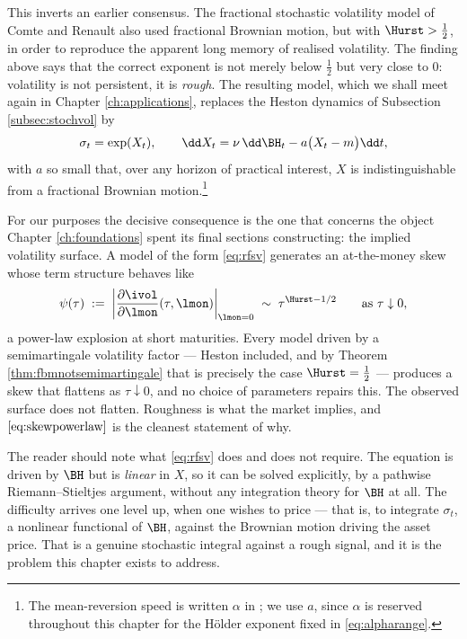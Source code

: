 This inverts an earlier consensus. The fractional stochastic volatility model of Comte and Renault
\cite{comterenault1998} also used fractional Brownian motion, but with $\Hurst > \tfrac12$, in order
to reproduce the apparent long memory of realised volatility. The finding above says that the
correct exponent is not merely below $\tfrac12$ but very close to $0$: volatility is not
persistent, it is \emph{rough}. The resulting model, which we shall meet again in Chapter
\ref{ch:applications}, replaces the Heston dynamics of Subsection \ref{subsec:stochvol} by
\begin{equation}\label{eq:rfsv}
\sigma_t = \exp(X_t), \qquad \dd X_t = \nu\,\dd \BH_t - a\bigl(X_t - m\bigr)\dd t,
\end{equation}
with $a$ so small that, over any horizon of practical interest, $X$ is indistinguishable from
a fractional Brownian motion.\footnote{The mean-reversion speed is written $\alpha$ in
\cite{gatheraljaissonrosenbaum2018}; we use $a$, since $\alpha$ is reserved throughout this chapter
for the H\"older exponent fixed in \eqref{eq:alpharange}.}

For our purposes the decisive consequence is the one that concerns the object Chapter \ref{ch:foundations}
spent its final sections constructing: the implied volatility surface. A model of the form
\eqref{eq:rfsv} generates an at-the-money skew whose term structure behaves like
\begin{equation}\label{eq:skewpowerlaw}
\psi(\tau) \;:=\; \biggl|\frac{\partial \ivol}{\partial \lmon}(\tau,\lmon)\biggr|_{\lmon=0} \;\sim\; \tau^{\Hurst - 1/2}
\qquad \text{as } \tau \downarrow 0 ,
\end{equation}
a power-law explosion at short maturities. Every model driven by a semimartingale volatility
factor --- Heston included, and by Theorem \ref{thm:fbmnotsemimartingale} that is precisely the
case $\Hurst = \tfrac12$ --- produces a skew that flattens as $\tau \downarrow 0$, and no choice of
parameters repairs this. The observed surface does not flatten. Roughness is what the market
implies, and $\eqref{eq:skewpowerlaw}$ is the cleanest statement of why.

\begin{remark}
The reader should note what \eqref{eq:rfsv} does and does not require. The equation is driven by
$\BH$ but is \emph{linear} in $X$, so it can be solved explicitly, by a pathwise
Riemann--Stieltjes argument, without any integration theory for $\BH$ at all. The difficulty
arrives one level up, when one wishes to price --- that is, to integrate $\sigma_t$, a nonlinear
functional of $\BH$, against the Brownian motion driving the asset price. That is a genuine
stochastic integral against a rough signal, and it is the problem this chapter exists to address.
\end{remark}

